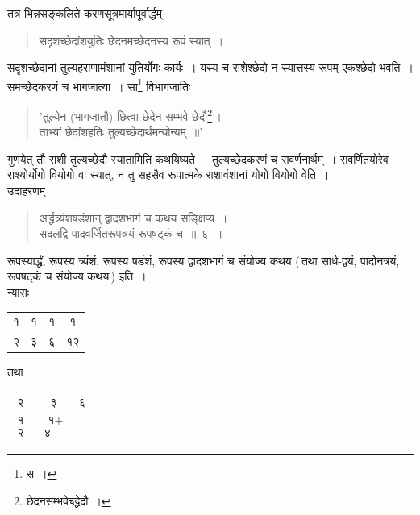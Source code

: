 \documentclass[10pt, openany]{book}
\begin{document}
तत्र भिन्नसङ्कलिते करणसूत्रमार्यापूर्वार्द्धम्\textemdash 

 \label{32.1}
\begin{quote}
{\bs सदृशच्छेदांशयुतिः छेदनमच्छेदनस्य रूपं स्यात्~।}\end{quote}

{सदृशच्छेदानां तुल्यहराणामंशानां युतिर्योगः कार्यः~। 
यस्य च राशेश्छेदो न स्यात्तस्य रूपम् एकश्छेदो भवति~। समच्छेदकरणं च भागजात्या~। सा\renewcommand{\thefootnote}{\s २}\footnote{\s स~।}
विभागजातिः}

\begin{quote}
    
{\qt  'तुल्येन (भागजातौ) छित्वा छेदेन सम्भवे छेदौ\renewcommand{\thefootnote}{\s ३}\footnote{\s छेदनसम्भवेच्द्धेदौ~।}\,। \\
 ताभ्यां छेदांशहतिः तुल्यच्छेदार्थमन्योन्यम्~॥'}\end{quote}

{गुणयेत् तौ राशी तुल्यच्छेदौ स्यातामिति कथयिष्यते~। तुल्यच्छेदकरणं च
सवर्णनार्थम्~। सवर्णितयोरेव राश्योर्योगो वियोगो वा स्यात्, न तु सहसैव रूपात्मके राशावंशानां
योगो वियोगो वेति~।}\\

{उदाहरणम्\textemdash}

\begin{quote}
    
{\eg अर्द्धत्र्यंशषडंशान् द्वादशभागं च कथय सङ्क्षिप्य~। \\
 सदलद्वि पादवर्जितरूपत्रयं रूपषट्कं च~॥~६~॥}\end{quote}

{रूपस्यार्द्धं, रूपस्य त्र्यंशं, रूपस्य षडंशं, रूपस्य द्वादशभागं च
संयोज्य कथय (\,तथा}
{सार्ध-द्वयं, पादोनत्रयं, रूपषट्कं च संयोज्य कथय\,) इति~।}\\

{न्यासः\textemdash}
\vspace{-10mm}

\begin{center}
\begin{tabular}{cccc} १ &१& १& १\\
२ &३ &६ &१२ \end{tabular} तथा \begin{tabular}{ccc}२& ३& ६ \\
$\begin{matrix}

\mbox{{१}}\\

\mbox{{२}}

\end{matrix}$ & $\begin{matrix}

\mbox{{~१+}}\\

\mbox{{४}}

\end{matrix}$&
\end{tabular}
\end{center}
\end{document}
